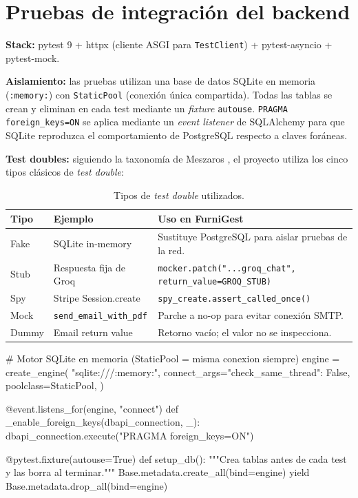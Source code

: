 \documentclass[12pt,twoside,titlepage]{report}
\begin{document}
\section{Pruebas de integración del backend}

\textbf{Stack:} pytest 9 \cite{pytest} + httpx (cliente ASGI para \texttt{TestClient}) + pytest-asyncio + pytest-mock.

\textbf{Aislamiento:} las pruebas utilizan una base de datos SQLite en memoria (\texttt{:memory:}) con \texttt{StaticPool} (conexión única compartida). Todas las tablas se crean y eliminan en cada test mediante un \emph{fixture} \texttt{autouse}. \texttt{PRAGMA foreign\_keys=ON} se aplica mediante un \emph{event listener} de SQLAlchemy para que SQLite reproduzca el comportamiento de PostgreSQL respecto a claves foráneas.

\textbf{Test doubles:} siguiendo la taxonomía de Meszaros \cite{meszaros}, el proyecto utiliza los cinco tipos clásicos de \emph{test double}:

\begin{table}[H]
  \centering
  \caption{Tipos de \emph{test double} utilizados.}
  \label{tab:testdoubles}
  \begin{tabularx}{\textwidth}{llX}
    \toprule
    \textbf{Tipo} & \textbf{Ejemplo} & \textbf{Uso en FurniGest} \\
    \midrule
    Fake  & SQLite in-memory   & Sustituye PostgreSQL para aislar pruebas de la red. \\
    Stub  & Respuesta fija de Groq & \texttt{mocker.patch("...groq\_chat", return\_value=GROQ\_STUB)} \\
    Spy   & Stripe Session.create & \texttt{spy\_create.assert\_called\_once()} \\
    Mock  & \texttt{send\_email\_with\_pdf} & Parche a no-op para evitar conexión SMTP. \\
    Dummy & Email return value & Retorno vacío; el valor no se inspecciona. \\
    \bottomrule
  \end{tabularx}
\end{table}

\begin{mypython}[caption={Configuración de base de datos para pruebas (conftest.py).},label={code:conftest}]
# Motor SQLite en memoria (StaticPool = misma conexion siempre)
engine = create_engine(
    "sqlite:///:memory:",
    connect_args={"check_same_thread": False},
    poolclass=StaticPool,
)

@event.listens_for(engine, "connect")
def _enable_foreign_keys(dbapi_connection, _):
    dbapi_connection.execute("PRAGMA foreign_keys=ON")

@pytest.fixture(autouse=True)
def setup_db():
    """Crea tablas antes de cada test y las borra al terminar."""
    Base.metadata.create_all(bind=engine)
    yield
    Base.metadata.drop_all(bind=engine)
\end{mypython}
\end{document}
